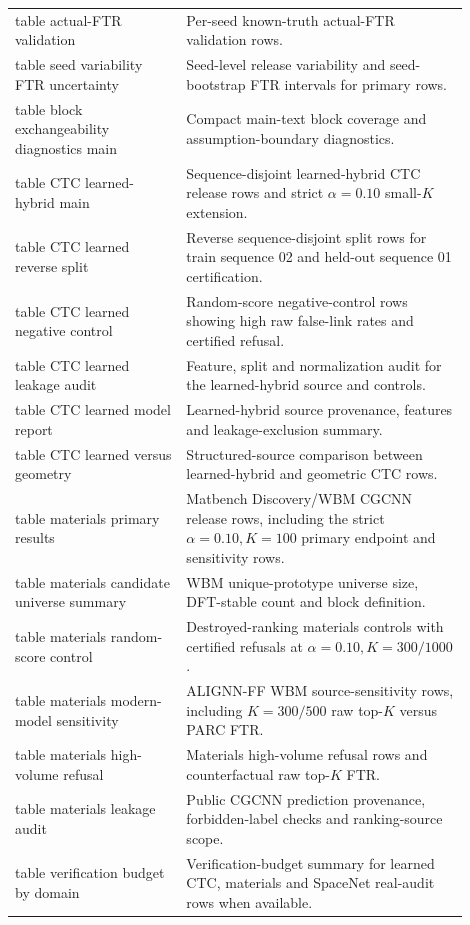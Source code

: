 \documentclass[11pt]{article}
\begin{document}
\begin{longtable}{p{0.34\linewidth}p{0.56\linewidth}}
table actual-FTR validation & Per-seed known-truth actual-FTR validation rows. \\
table seed variability FTR uncertainty & Seed-level release variability and seed-bootstrap FTR intervals for primary rows. \\
table block exchangeability diagnostics main & Compact main-text block coverage and assumption-boundary diagnostics. \\
table CTC learned-hybrid main & Sequence-disjoint learned-hybrid CTC release rows and strict \(\alpha=0.10\) small-\(K\) extension. \\
table CTC learned reverse split & Reverse sequence-disjoint split rows for train sequence 02 and held-out sequence 01 certification. \\
table CTC learned negative control & Random-score negative-control rows showing high raw false-link rates and certified refusal. \\
table CTC learned leakage audit & Feature, split and normalization audit for the learned-hybrid source and controls. \\
table CTC learned model report & Learned-hybrid source provenance, features and leakage-exclusion summary. \\
table CTC learned versus geometry & Structured-source comparison between learned-hybrid and geometric CTC rows. \\
table materials primary results & Matbench Discovery/WBM CGCNN release rows, including the strict \(\alpha=0.10,K=100\) primary endpoint and sensitivity rows. \\
table materials candidate universe summary & WBM unique-prototype universe size, DFT-stable count and block definition. \\
table materials random-score control & Destroyed-ranking materials controls with certified refusals at \(\alpha=0.10,K=300/1000\). \\
table materials modern-model sensitivity & ALIGNN-FF WBM source-sensitivity rows, including \(K=300/500\) raw top-\(K\) versus PARC FTR. \\
table materials high-volume refusal & Materials high-volume refusal rows and counterfactual raw top-\(K\) FTR. \\
table materials leakage audit & Public CGCNN prediction provenance, forbidden-label checks and ranking-source scope. \\
table verification budget by domain & Verification-budget summary for learned CTC, materials and SpaceNet real-audit rows when available. \\

\end{longtable}
\end{document}
